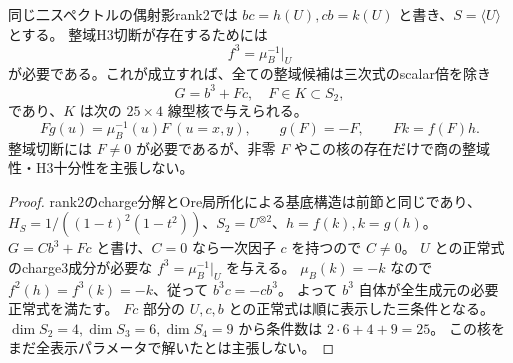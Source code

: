 \begin{proposition}
\label{prop:cubic-fourth-root-unit-simple-rank2-kernel}
同じ二スペクトルの偶射影rank2では $bc=h(U),cb=k(U)$ と書き、$S=\langle U\rangle$ とする。
整域H3切断が存在するためには
\[
 f^3=\mu_B^{-1}|_U
\]
が必要である。これが成立すれば、全ての整域候補は三次式のscalar倍を除き
\[
 G=b^3+F c,\quad F\in K\subset S_2,
\]
であり、$K$ は次の $25\times4$ 線型核で与えられる。
\[
 Fg(u)=\mu_B^{-1}(u)F\ (u=x,y),\qquad
 g(F)=-F,\qquad Fk=f(F)h.
\]
整域切断には $F\ne0$ が必要であるが、非零 $F$ やこの核の存在だけで商の整域性・H3十分性を主張しない。
\end{proposition}
\begin{proof}
rank2のcharge分解とOre局所化による基底構造は前節と同じであり、
$H_S=1/((1-t)^2(1-t^2))$、$S_2=U^{\otimes2}$、$h=f(k),k=g(h)$。
$G=C b^3+Fc$ と書け、$C=0$ なら一次因子 $c$ を持つので $C\ne0$。
$U$ との正常式のcharge3成分が必要な $f^3=\mu_B^{-1}|_U$ を与える。
$\mu_B(k)=-k$ なので $f^2(h)=f^3(k)=-k$、従って $b^3c=-cb^3$。
よって $b^3$ 自体が全生成元の必要正常式を満たす。
$Fc$ 部分の $U,c,b$ との正常式は順に表示した三条件となる。
$\dim S_2=4,\dim S_3=6,\dim S_4=9$ から条件数は $2\cdot6+4+9=25$。
この核をまだ全表示パラメータで解いたとは主張しない。
\end{proof}
